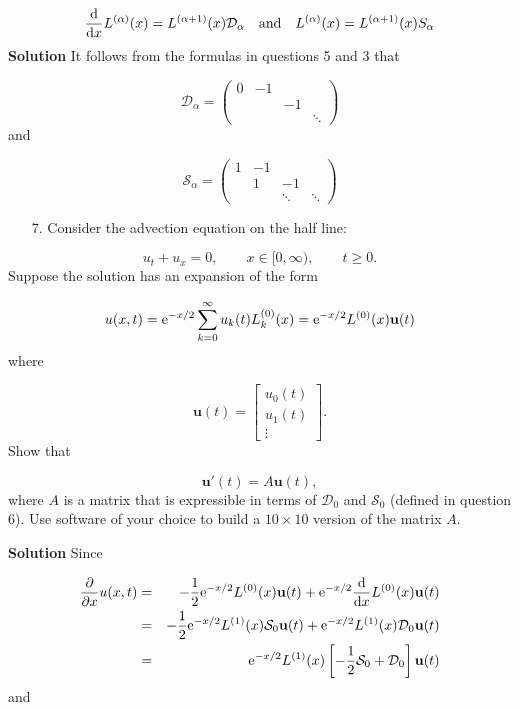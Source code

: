 \documentclass[12pt,a4paper]{article}
\begin{document}
\[
\frac{{\rm d}}{{\rm d}x}L^{(\alpha)}(x) = L^{(\alpha+1)}(x)\mathcal{D}_{\alpha} \quad \text{and} \quad L^{(\alpha)}(x) = L^{(\alpha+1)}(x)S_{\alpha}
\]
\textbf{Solution} It follows from the formulas in questions 5 and 3 that

\[
\mathcal{D}_{\alpha} = \begin{pmatrix}
0 & -1 \\
  &&-1 \\
  &&&\ddots
\end{pmatrix}
\]
and

\[
\mathcal{S}_{\alpha} = \begin{pmatrix}
        1 & -1 \\ & 1 & -1 \\&&\ddots & \ddots
\end{pmatrix}
\]
\begin{itemize}
\item[7. ] Consider the advection equation on the half line:

\end{itemize}
\[
u_t + u_x = 0, \qquad x \in [0, \infty), \qquad t \geq 0.
\]
Suppose the solution has an expansion of the form

\[
u(x,t) =  {\rm e}^{-x/2}\sum_{k=0}^{\infty}u_k(t) L_k^{(0)}(x) = {\rm e}^{-x/2}L^{(0)}(x)\mathbf{u}(t)
\]
where

\[
\mathbf{u}(t) = \begin{bmatrix}   
u_0(t) \\
u_1(t) \\
\vdots
\end{bmatrix}.
\]
Show that 

\[
\mathbf{u}'(t) = A\mathbf{u}(t),
\]
where $A$ is a matrix that is expressible in terms of $\mathcal{D}_0$ and $\mathcal{S}_0$ (defined in question 6).   Use software of your choice to build a $10 \times 10$ version of the matrix $A$.

\textbf{Solution} Since


\begin{eqnarray*}
\frac{\partial}{\partial x}u(x,t) &=& -\frac{1}{2}{\rm e}^{-x/2}L^{(0)}(x)\mathbf{u}(t)  + {\rm e}^{-x/2}\frac{{\rm d}}{{\rm d}x}L^{(0)}(x)\mathbf{u}(t) \\
&=& -\frac{1}{2}{\rm e}^{-x/2}L^{(1)}(x)\mathcal{S}_0\mathbf{u}(t)  + {\rm e}^{-x/2}L^{(1)}(x)\mathcal{D}_0\mathbf{u}(t) \\
&=& {\rm e}^{-x/2}L^{(1)}(x)\left[-\frac{1}{2}\mathcal{S}_0 + \mathcal{D}_0   \right]\mathbf{u}(t) \\
\end{eqnarray*}
and
\end{document}
